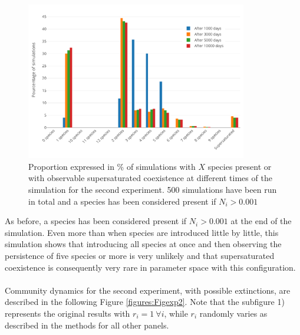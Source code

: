 \begin{figure}[H]
	\begin{center} 
		\includegraphics[width=0.86\textwidth]{../Code/Figures/Figure_exp2_bar.pdf}
 		\caption{Proportion expressed in \% of simulations with $X$ species present or with observable supersaturated coexistence at different times of the simulation for the second experiment. 500 simulations have been run in total and a species has been considered present if $N_i > 0.001$}
 		\label{figures:Figexp2bar}
	\end{center}
\end{figure}

As before, a species has been considered present if $N_i > 0.001$ at the end of the simulation. Even more than when species are introduced little by little, this simulation shows that introducing all species at once and then observing the persistence of five species or more is very unlikely and that supersaturated coexistence is consequently very rare in parameter space with this configuration.\\
\\
Community dynamics for the second experiment, with possible extinctions, are described in the following Figure \ref{figures:Figexp2}. Note that the subfigure 1) represents the original results with $r_i=1 ~\forall i$, while $r_i$ randomly varies as described in the methods for all other panels.

